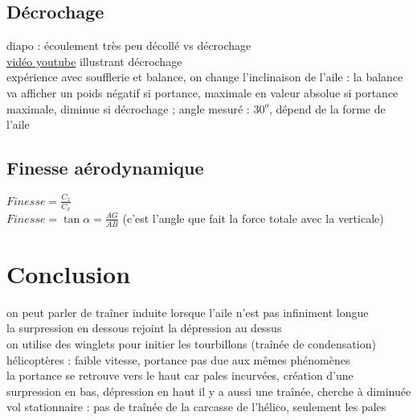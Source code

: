 \subsection{Décrochage}
diapo : écoulement très peu décollé vs décrochage \\
\href{https://www.youtube.com/watch?v=zwiMvBMVFMw}{vidéo youtube} illustrant décrochage \\
expérience avec soufflerie et balance, on change l'inclinaison de l'aile : la balance va afficher un poids négatif si portance, maximale en valeur absolue si portance maximale, diminue si décrochage ; angle mesuré : $30^o$, dépend de la forme de l'aile \\

\subsection{Finesse aérodynamique}
$Finesse=\frac{C_z}{C_x}$ \\
$Finesse=\tan \alpha = \frac{AG}{AB}$ (c'est l'angle que fait la force totale avec la verticale) \\


\section*{Conclusion}
on peut parler de traîner induite lorsque l'aile n'est pas infiniment longue \\
la surpression en dessous rejoint la dépression au dessus \\
on utilise des winglets pour initier les tourbillons (traînée de condensation) \\ 
hélicoptères : faible vitesse, portance pas due aux mêmes phénomènes \\
la portance se retrouve vers le haut car pales incurvées, création d'une surpression en bas, dépression en haut
il y a aussi une traînée, cherche à diminuée \\
vol stationnaire : pas de traînée de la carcasse de l'hélico, seulement les pales \\

